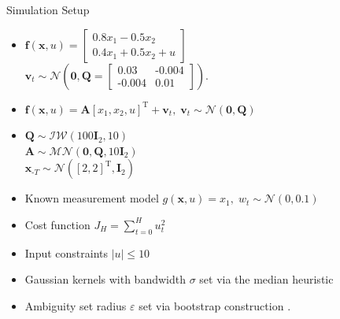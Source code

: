 \documentclass[student, noshadow, itr, english, aspectratio=169]{ITR_LSR_slides}
\begin{document}
\begin{frame}{Simulation Setup}
\begin{itemize}
\item 
{}
$\boldsymbol{f}(\boldsymbol{x}, u) = 
\begin{bmatrix}
0.8  x_1 - 0.5 x_2 \\
0.4 x_1 + 0.5 x_2 + u
\end{bmatrix}$ \\
\makebox[4cm]{\hfill} $\boldsymbol{v}_t \sim \mathcal{N} \left(\boldsymbol{0}, \boldsymbol{Q} =  
\begin{bmatrix}
0.03 & \text{-}0.004 \\
\text{-}0.004 & 0.01
\end{bmatrix}
\right).$

\item 
{} $\boldsymbol{f}(\boldsymbol{x}, u) = \boldsymbol{A} \left[ x_1,  x_2,  u \right]^\text{T} + \boldsymbol{v}_{t}, \; \boldsymbol{v}_{t} \sim \mathcal{N} (\boldsymbol{0}, \boldsymbol{Q})$ 
\item
{} $\boldsymbol{Q} \sim \mathcal{IW} (100 \boldsymbol{I}_2, 10)$ \\
\makebox[4.5cm]{\hfill} $\boldsymbol{A} \sim \mathcal{MN} (\boldsymbol{0}, \boldsymbol{Q}, 10 \boldsymbol{I}_2)\;\;\;\;\;\;\;\;\;\;\;\;\;\;\;\;\;\;$ \cite{Svensson_17}\\
\makebox[4.5cm]{\hfill} $\boldsymbol{x}_{\text{-}T} \sim \mathcal{N} ([2, 2]^\text{T}, \boldsymbol{I}_2)$


\item Known measurement model $g(\boldsymbol{x}, u) = x_1, \; w_t \sim \mathcal{N} (0, 0.1)$

\item Cost function $J_H = \sum_{t = 0}^H u_t^2$

\item Input constraints $\left| u \right| \leq 10$

\item Gaussian kernels with bandwidth $\sigma$ set via the median heuristic \cite{Damien_18}

\item Ambiguity set radius $\varepsilon$ set via bootstrap construction \cite{Yassine_22}.
\end{itemize}
\end{frame}	
\end{document}
